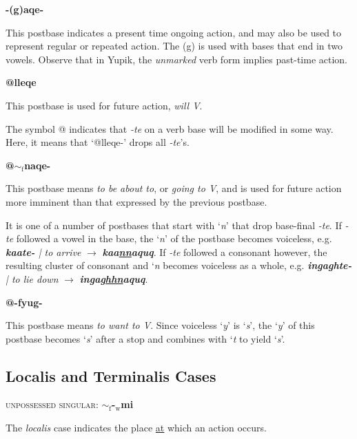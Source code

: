 \documentclass{article}
\begin{document}
\textbf{-(g)aqe-}

This postbase indicates a present time ongoing action, and may also be used to represent regular or repeated action. 
%
The (g) is used with bases that end in two vowels.
%
Observe that in Yupik, the \textit{unmarked} verb form implies past-time action.

\vspace{12pt}

\textbf{@lleqe}

This postbase is used for future action, \textit{will V}.

The symbol @ indicates that \textit{-te} on a verb base will be modified in some way.
%
Here, it means that `@lleqe-' drops all \textit{-te}'s.

\vspace{12pt}

\textbf{@$\sim_\text{f}$naqe-}

This postbase means \textit{to be about to}, or \textit{going to V}, and is used for future action more imminent than that expressed by the previous postbase.

It is one of a number of postbases that start with `\textit{n}' that drop base-final \textit{-te}.
%
If \textit{-te} followed a vowel in the base, the `\textit{n}' of the postbase becomes voiceless, e.g. \textit{\textbf{kaate-} | to arrive} $\rightarrow$ \textbf{\textit{kaa\underline{nn}aquq}}.
%
If \textit{-te} followed a consonant however, the resulting cluster of consonant and `\textit{n} becomes voiceless as a whole, e.g. \textit{\textbf{ingaghte-} | to lie down} $\rightarrow$ \textit{\textbf{inga\underline{ghhn}aquq}}.

\vspace{12pt}

\textbf{@-fyug-}

This postbase means \textit{to want to V}.
%
Since voiceless `\textit{y}' is `\textit{s}', the `\textit{y}' of this postbase becomes `\textit{s}' after a stop and combines with `\textit{t} to yield `\textit{s}'.

\subsection{Localis and Terminalis Cases}

\textsc{unpossessed singular}: \textbf{$\sim_\text{f}$-$_\text{w}$mi}

The \textit{localis} case indicates the place \underline{at} which an action occurs.
\end{document}
